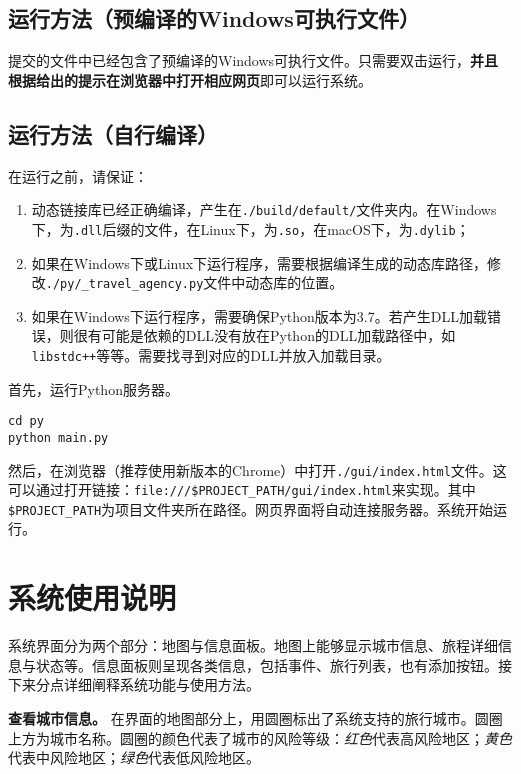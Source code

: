 \subsection{运行方法（预编译的Windows可执行文件）}

提交的文件中已经包含了预编译的Windows可执行文件。只需要双击运行，\textbf{并且根据给出的提示在浏览器中打开相应网页}即可以运行系统。

\subsection{运行方法（自行编译）}

在运行之前，请保证：
\begin{enumerate}
  \item 动态链接库已经正确编译，产生在\texttt{./build/default/}文件夹内。在Windows下，为\texttt{.dll}后缀的文件，在Linux下，为\texttt{.so}，在macOS下，为\texttt{.dylib}；
  \item 如果在Windows下或Linux下运行程序，需要根据编译生成的动态库路径，修改\texttt{./py/\_travel\_agency.py}文件中动态库的位置。
  \item 如果在Windows下运行程序，需要确保Python版本为3.7。若产生DLL加载错误，则很有可能是依赖的DLL没有放在Python的DLL加载路径中，如 \lstinline{libstdc++}等等。需要找寻到对应的DLL并放入加载目录。
\end{enumerate}

首先，运行Python服务器。
\begin{verbatim}
cd py
python main.py
\end{verbatim}

然后，在浏览器（推荐使用新版本的Chrome）中打开\texttt{./gui/index.html}文件。这可以通过打开链接：\texttt{file:///\$PROJECT\_PATH/gui/index.html}来实现。其中\texttt{\$PROJECT\_PATH}为项目文件夹所在路径。网页界面将自动连接服务器。系统开始运行。

\section{系统使用说明}
\label{sec:manual}

系统界面分为两个部分：地图与信息面板。地图上能够显示城市信息、旅程详细信息与状态等。信息面板则呈现各类信息，包括事件、旅行列表，也有添加按钮。接下来分点详细阐释系统功能与使用方法。

\textbf{查看城市信息。} \quad 在界面的地图部分上，用圆圈标出了系统支持的旅行城市。圆圈上方为城市名称。圆圈的颜色代表了城市的风险等级：\textit{{\color{high-risk}红色}}代表高风险地区；\textit{{\color{mid-risk}黄色}}代表中风险地区；\textit{{\color{low-risk}绿色}}代表低风险地区。

